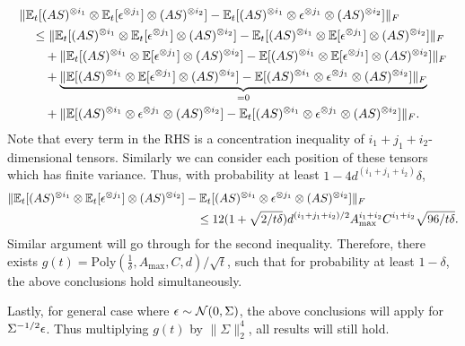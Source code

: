 \begin{align*}
&\|\mathbb{E}_t[(AS)^{\otimes i_1}\otimes \mathbb{E}_t[\epsilon^{\otimes j_1}] \otimes (AS)^{\otimes i_2}] - \mathbb{E}_t[(AS)^{\otimes i_1}\otimes \epsilon^{\otimes j_1}\otimes (AS)^{\otimes i_2}]  \|_F \\
& \quad \le  \|\mathbb{E}_t[(AS)^{\otimes i_1}\otimes \mathbb{E}_t[\epsilon^{\otimes j_1}] \otimes (AS)^{\otimes i_2}] - \mathbb{E}_t[(AS)^{\otimes i_1}\otimes \mathbb{E}[\epsilon^{\otimes j_1}] \otimes (AS)^{\otimes i_2}] \|_F \\
& \quad \quad + \| \mathbb{E}_t[(AS)^{\otimes i_1}\otimes \mathbb{E}[\epsilon^{\otimes j_1}] \otimes (AS)^{\otimes i_2}] - \mathbb{E}[(AS)^{\otimes i_1}\otimes \mathbb{E}[\epsilon^{\otimes j_1}] \otimes (AS)^{\otimes i_2}] \|_F \\
& \quad \quad + \underbrace{\|\mathbb{E}[(AS)^{\otimes i_1}\otimes \mathbb{E}[\epsilon^{\otimes j_1}] \otimes (AS)^{\otimes i_2}]  - \mathbb{E}[(AS)^{\otimes i_1}\otimes \epsilon^{\otimes j_1}\otimes (AS)^{\otimes i_2}] \|_F}_{=0} \\
& \quad \quad + \| \mathbb{E}[(AS)^{\otimes i_1}\otimes \epsilon^{\otimes j_1}\otimes (AS)^{\otimes i_2}] - \mathbb{E}_t[(AS)^{\otimes i_1}\otimes \epsilon^{\otimes j_1}\otimes (AS)^{\otimes i_2}] \|_F.
\end{align*}
Note that every term in the RHS is a concentration inequality of $i_1+j_1+i_2$-dimensional tensors. Similarly we can consider each position of these tensors which has finite variance.
Thus, with probability at least $1- 4d^{(i_1+j_1+i_2)}\delta$,   
\begin{align*}
\|\mathbb{E}_t[(AS)^{\otimes i_1}\otimes \mathbb{E}_t[\epsilon^{\otimes j_1}] \otimes (AS)^{\otimes i_2}] & - \mathbb{E}_t[(AS)^{\otimes i_1}\otimes \epsilon^{\otimes j_1}\otimes (AS)^{\otimes i_2}]  \|_F \\
& \quad \le
12(1+\sqrt{2/t\delta})d^{(i_1+j_1+i_2)/2}A_{\max}^{i_1+i_2}C^{i_1+i_2}\sqrt{96/t\delta}.  
\end{align*}
Similar argument will go through for the second inequality.
Therefore, there exists $g(t) = \text{Poly}(\frac{1}{\delta}, A_{\max}, C, d)/\sqrt{t}$, such that for probability at least $1-\delta$, the above conclusions hold simultaneously.

Lastly, for general case where $\epsilon\sim {\cal{N}}(0,\Sigma)$, the above conclusions will apply for $\Sigma^{-1/2}\epsilon$. Thus multiplying  $g(t)$ by $ \|\Sigma\|^4_2$, all results will still hold. 
